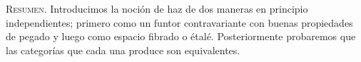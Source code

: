 \textsc{Resumen.} Introducimos la noción de haz de dos maneras en principio independientes; primero como un funtor contravariante con buenas propiedades de pegado y luego como espacio fibrado o étalé. Posteriormente probaremos que las categorías que cada una produce son equivalentes.

